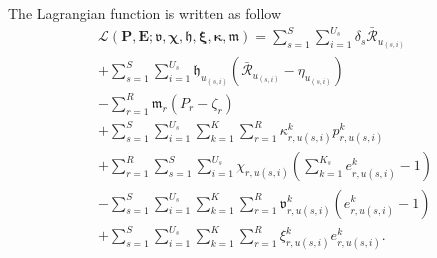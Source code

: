 \documentclass[conference]{IEEEtran}
\begin{document}
The Lagrangian function is written as follow
\begin{subequations}\label{lagrang}
\begin{alignat}{4}
&\mathcal{L}(\boldsymbol{P},\boldsymbol{E}; \boldsymbol{\mathfrak{v}}, \boldsymbol{\chi}, \boldsymbol{\mathfrak{h}}, \boldsymbol{ \xi}, \boldsymbol{ \kappa}, \boldsymbol{\mathfrak{m}})  = \sum\limits_{s=1}^{S} \sum\limits_{i=1}^{U_s}\delta_s\mathcal{\bar{R}}_{u_{(s,i)}}\\
&+\sum\limits_{s=1}^{S} \sum\limits_{i=1}^{U_s}\mathfrak{h}_{u_{(s,i)}} (\mathcal{\bar{R}}_{u_{(s,i)}}-\eta_{u_{(s,i)}})\\
&-  \sum\limits_{r=1}^{R} \mathfrak{m}_{r} (P_{r}- \zeta_r)\\
&+  \sum\limits_{s=1}^{S} \sum\limits_{i=1}^{U_s}\sum\limits_{k=1}^{K} \sum\limits_{r=1}^{R}\kappa^k_{r,u(s,i)}  p^k_{r,u(s,i)}\\
&+ \sum\limits_{r=1}^{R}\sum\limits_{s=1}^{S} \sum\limits_{i=1}^{U_s}\chi_{r,u(s,i)}(\sum_{k =1}^{K_s} e^{k}_{r,u(s,i)} -1)\\
&-  \sum\limits_{s=1}^{S} \sum\limits_{i=1}^{U_s}\sum\limits_{k=1}^{K} \sum\limits_{r=1}^{R}\mathfrak{v}^{k}_{r,u(s,i)} (e^{k}_{r,u(s,i)} -1)\\
&+  \sum\limits_{s=1}^{S} \sum\limits_{i=1}^{U_s}\sum\limits_{k=1}^{K} \sum\limits_{r=1}^{R} \xi^{k}_{r,u(s,i)} e^{k}_{r,u(s,i)}.
\end{alignat}
\end{subequations}
\end{document}
